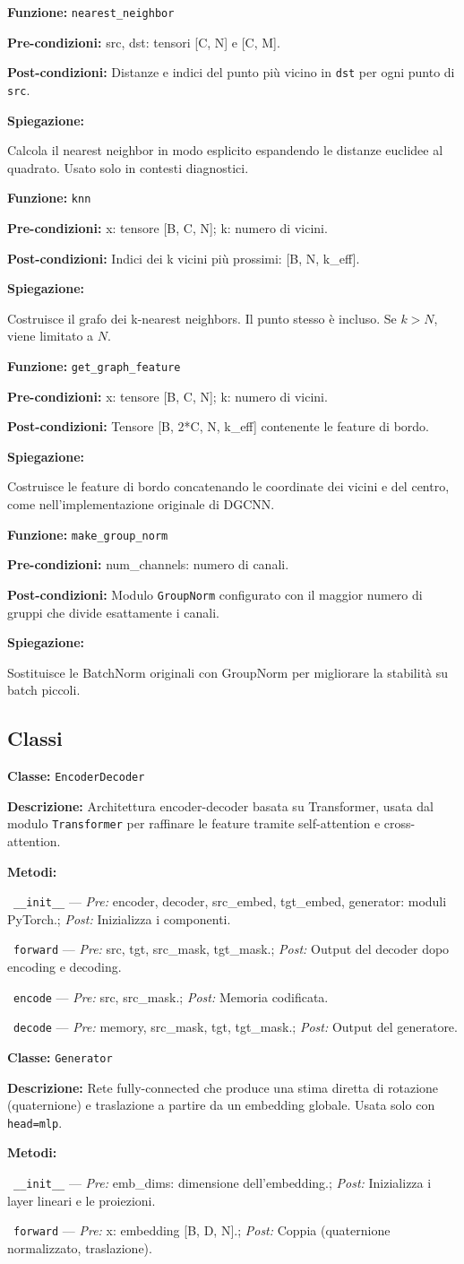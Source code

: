 \documentclass[11pt,a4paper]{article}
\newenvironment{functionspec}[3]{%
    \par\medskip\noindent
    \textbf{Funzione:} \texttt{#1}\par
    \textbf{Pre-condizioni:} #2\par
    \textbf{Post-condizioni:} #3\par
    \textbf{Spiegazione:}\par\noindent\ignorespaces
}{%
    \par\medskip
}
\newenvironment{classspec}[2]{%
    \par\medskip\noindent
    \textbf{Classe:} \texttt{#1}\par
    \textbf{Descrizione:} #2\par
    \textbf{Metodi:}\par
    \begingroup
    \setlength{\parindent}{0pt}%
    \setlength{\parskip}{2pt}%
}{%
    \endgroup
    \par\medskip
}
\newcommand{\method}[3]{%
    \noindent\hspace*{1.2em}\textbullet~\texttt{#1} --- \textit{Pre:} #2; \textit{Post:} #3\par
}
\begin{document}
\begin{functionspec}{nearest\_neighbor}{src, dst: tensori [C, N] e [C, M].}{Distanze e indici del punto più vicino in \texttt{dst} per ogni punto di \texttt{src}.}
Calcola il nearest neighbor in modo esplicito espandendo le distanze euclidee al quadrato. Usato solo in contesti diagnostici.
\end{functionspec}

\begin{functionspec}{knn}{x: tensore [B, C, N]; k: numero di vicini.}{Indici dei k vicini più prossimi: [B, N, k\_eff].}
Costruisce il grafo dei k-nearest neighbors. Il punto stesso è incluso. Se \(k > N\), viene limitato a \(N\).
\end{functionspec}

\begin{functionspec}{get\_graph\_feature}{x: tensore [B, C, N]; k: numero di vicini.}{Tensore [B, 2*C, N, k\_eff] contenente le feature di bordo.}
Costruisce le feature di bordo concatenando le coordinate dei vicini e del centro, come nell'implementazione originale di DGCNN.
\end{functionspec}

\begin{functionspec}{make\_group\_norm}{num\_channels: numero di canali.}{Modulo \texttt{GroupNorm} configurato con il maggior numero di gruppi che divide esattamente i canali.}
Sostituisce le BatchNorm originali con GroupNorm per migliorare la stabilità su batch piccoli.
\end{functionspec}

\subsection{Classi}

\begin{classspec}{EncoderDecoder}{Architettura encoder-decoder basata su Transformer, usata dal modulo \texttt{Transformer} per raffinare le feature tramite self-attention e cross-attention.}
\method{\_\_init\_\_}{encoder, decoder, src\_embed, tgt\_embed, generator: moduli PyTorch.}{Inizializza i componenti.}
\method{forward}{src, tgt, src\_mask, tgt\_mask.}{Output del decoder dopo encoding e decoding.}
\method{encode}{src, src\_mask.}{Memoria codificata.}
\method{decode}{memory, src\_mask, tgt, tgt\_mask.}{Output del generatore.}
\end{classspec}

\begin{classspec}{Generator}{Rete fully-connected che produce una stima diretta di rotazione (quaternione) e traslazione a partire da un embedding globale. Usata solo con \texttt{head=mlp}.}
\method{\_\_init\_\_}{emb\_dims: dimensione dell'embedding.}{Inizializza i layer lineari e le proiezioni.}
\method{forward}{x: embedding [B, D, N].}{Coppia (quaternione normalizzato, traslazione).}
\end{classspec}
\end{document}
